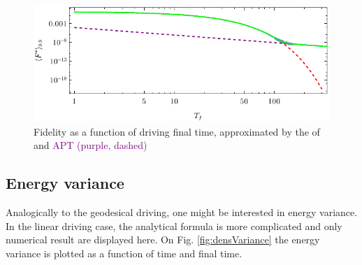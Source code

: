 \begin{figure}[h]
    \centering 
    \includegraphics[scale=1.2]{../img/landauCompare.pdf}
    \caption{Fidelity as a function of driving final time, approximated by the  of  and \textcolor{purple}{APT (purple, dashed)}}
    \label{fig:landauCompare}
\end{figure}


\subsection{Energy variance}
Analogically to the geodesical driving, one might be interested in energy variance. In the linear driving case, the analytical formula is more complicated and only numerical result are displayed here. On Fig. \ref{fig:densVariance} the energy variance is plotted as a function of time and final time.

